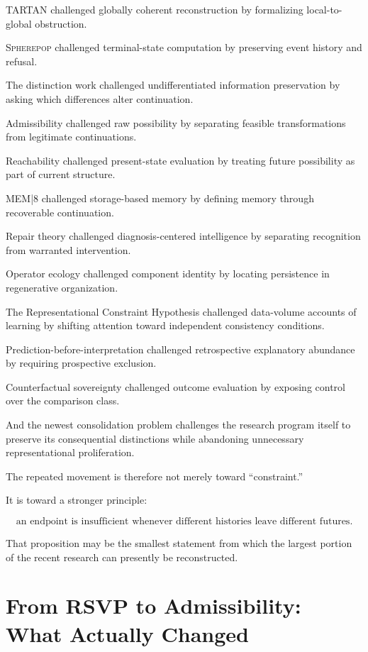 \documentclass[11pt]{article}
\theoremstyle{remark}
\newcommand{\TARTAN}{\textsc{TARTAN}}
\newcommand{\MEM}{\textsc{MEM|8}}
\newcommand{\Spherepop}{\textsc{Spherepop}}
\begin{document}
\TARTAN{} challenged globally coherent reconstruction by formalizing local-to-global obstruction.

\Spherepop{} challenged terminal-state computation by preserving event history and refusal.

The distinction work challenged undifferentiated information preservation by asking which differences alter continuation.

Admissibility challenged raw possibility by separating feasible transformations from legitimate continuations.

Reachability challenged present-state evaluation by treating future possibility as part of current structure.

\MEM{} challenged storage-based memory by defining memory through recoverable continuation.

Repair theory challenged diagnosis-centered intelligence by separating recognition from warranted intervention.

Operator ecology challenged component identity by locating persistence in regenerative organization.

The Representational Constraint Hypothesis challenged data-volume accounts of learning by shifting attention toward independent consistency conditions.

Prediction-before-interpretation challenged retrospective explanatory abundance by requiring prospective exclusion.

Counterfactual sovereignty challenged outcome evaluation by exposing control over the comparison class.

And the newest consolidation problem challenges the research program itself to preserve its consequential distinctions while abandoning unnecessary representational proliferation.

The repeated movement is therefore not merely toward ``constraint.''

It is toward a stronger principle:

\begin{equation}
\boxed{
\text{an endpoint is insufficient whenever different histories leave different futures}.
}
\end{equation}

That proposition may be the smallest statement from which the largest portion of the recent research can presently be reconstructed.

\section{From RSVP to Admissibility: What Actually Changed}
\end{document}
